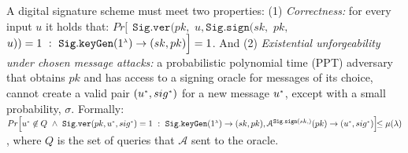 \vspace{-1mm}
A digital signature scheme must meet two properties: (1) \textit{Correctness:} for every input $u$ it holds that:
%
$Pr\Big[\  \  \mathtt{Sig.ver}( pk, $ $u, \mathtt{Sig.sign}(sk,$ $ pk,$ $ u))=1\ : \
\mathtt{Sig.keyGen}(1^{\scriptscriptstyle \lambda})\rightarrow (sk, pk)  \Big]=1$. And 
%
(2) \textit{Existential unforgeability under chosen message attacks:} a probabilistic polynomial time (PPT) adversary that obtains $pk$ and has access to a signing oracle for messages of its choice, cannot create a valid pair $(u^{\scriptscriptstyle *},sig^{\scriptscriptstyle *})$ for a new message $u^{\scriptscriptstyle *}$, except with a small probability, $\sigma$. Formally: 
%
%
{\small{
$ Pr\Big[
 u^{\st *}\not\in Q\ \wedge \
   \mathtt{Sig.ver}( pk,  u^{\st *}, sig^{\st *}) =1\ : \ 
% 
    \mathtt{Sig.keyGen}(1^{\st \lambda})\rightarrow (sk, pk),
  \mathcal{A}^{\mathtt{Sig.sign}(sk,)}(pk)\rightarrow(u^{\st *}, sig^{\st *}) 
   \Big]\lhs\leq \mu(\lambda)$}},
where $Q$ is the set of queries that $\mathcal{A}$ sent to the oracle.






